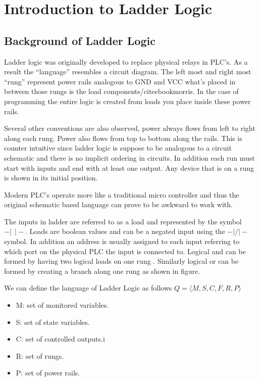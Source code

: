 
\chapter{Introduction to Ladder Logic}
\section{Background of Ladder Logic}
\label{section:ladderlogic}

Ladder logic was originally developed to replace physical relays in PLC's.
As a result the ``language'' resembles a circuit diagram. The left most
and right most ``rung'' represent power rails analogous to GND and VCC what's
placed in between those rungs is the load components/cite{ebookmorris}. In 
the case of programming the entire logic is created from loads you place 
inside these power rails. 

Several other conventions are also observed, power always flows from left 
to right along each rung. Power also flows from top to bottom along the 
rails. This is counter intuitive since ladder logic is suppose to be 
analogous to a circuit schematic and there is no implicit
ordering in circuits. In addition each run must start with inputs and end
with at least one output. Any device that is on a rung is shown in its
initial position.

Modern PLC's operate more like a traditional micro controller and thus the 
original schematic based language can prove to be awkward to work with.

The inputs in ladder are referred to as a load and represented by the 
symbol $-\vert ~ ~ \vert-$. %
Loads are boolean values and can be a negated input using the $-\vert/\vert-$ symbol. 
In addition an address is usually assigned to each input referring to 
which port on the physical PLC the input is connected to. Logical and 
can be formed by having two logical loads on one rung \cite{ebookmorris}. 
Similarly logical or can be formed by creating a branch along one 
rung as shown in figure. %

We can define the language of Ladder Logic as follows $Q = \langle M,S,C,F,R,P \rangle $

\begin{itemize}
	\item M: set of monitored variables.
	\item S: set of state variables.
	\item C: set of controlled outputs.i
        \item R: set of rungs.
	\item P: set of power rails.
\end{itemize}

